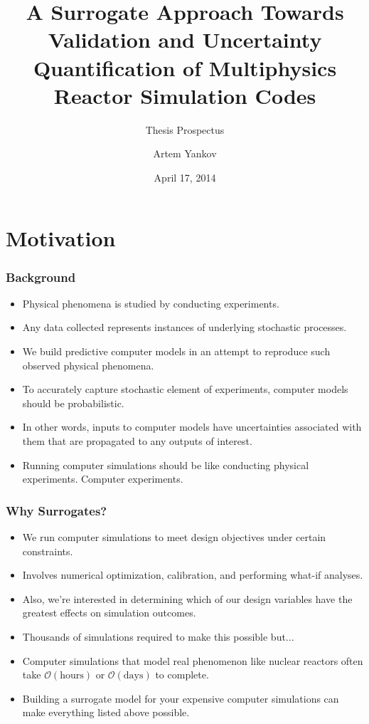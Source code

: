 \documentclass{beamer}
\title[]{A Surrogate Approach Towards Validation and Uncertainty Quantification of Multiphysics Reactor Simulation Codes}
\subtitle[]{Thesis Prospectus}
\author[]{Artem Yankov}
\institute[]{University of Michigan}
\date{April 17, 2014}
\begin{document}
\begin{frame}
\titlepage
\end{frame}

\section{Motivation}

\begin{frame}
\frametitle{Background}

\begin{itemize}
  \item Physical phenomena is studied by conducting experiments. 
  \item Any data collected represents instances of underlying stochastic processes.  
  \item We build predictive computer models in an attempt to reproduce such observed physical phenomena.
  \item To accurately capture stochastic element of experiments, computer models should be probabilistic.  
  \item In other words, inputs to computer models have uncertainties associated with them that are propagated to any outputs of interest.
  \item Running computer simulations should be like conducting physical experiments. Computer experiments.      
\end{itemize}

\end{frame}
\begin{frame}
\frametitle{Why Surrogates?}

\begin{itemize}
  \item We run computer simulations to meet design objectives under certain constraints. 
  \item Involves numerical optimization, calibration, and performing what-if analyses.
  \item Also, we're interested in determining which of our design variables have the greatest effects on simulation outcomes. 
  \item Thousands of simulations required to make this possible but...  
  \item Computer simulations that model real phenomenon like nuclear reactors often take $\mathcal{O}(\mbox{hours})$ or $\mathcal{O}(\mbox{days})$ to complete.
  \item Building a surrogate model for your expensive computer simulations can make everything listed above possible.   
\end{itemize}

\end{frame}
\end{document}
